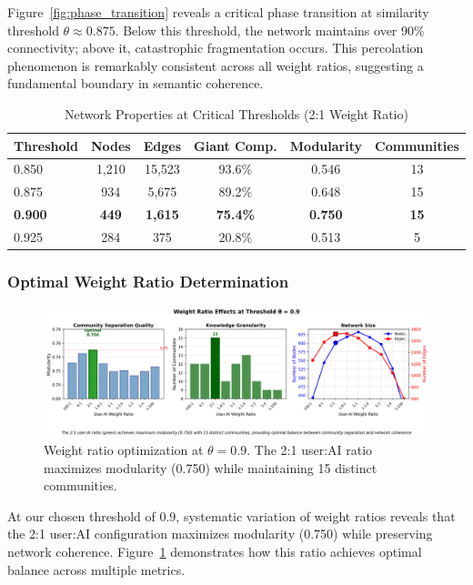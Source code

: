 \documentclass{svproc}
\begin{document}
Figure~\ref{fig:phase_transition} reveals a critical phase transition at similarity threshold $\theta \approx 0.875$. Below this threshold, the network maintains over 90\% connectivity; above it, catastrophic fragmentation occurs. This percolation phenomenon is remarkably consistent across all weight ratios, suggesting a fundamental boundary in semantic coherence.

\begin{table}[h]
\centering
\caption{Network Properties at Critical Thresholds (2:1 Weight Ratio)}
\label{tab:threshold_critical}
\begin{tabular}{lccccc}
\toprule
\textbf{Threshold} & \textbf{Nodes} & \textbf{Edges} & \textbf{Giant Comp.} & \textbf{Modularity} & \textbf{Communities} \\
\midrule
0.850 & 1,210 & 15,523 & 93.6\% & 0.546 & 13 \\
0.875 & 934 & 5,675 & 89.2\% & 0.648 & 15 \\
\textbf{0.900} & \textbf{449} & \textbf{1,615} & \textbf{75.4\%} & \textbf{0.750} & \textbf{15} \\
0.925 & 284 & 375 & 20.8\% & 0.513 & 5 \\
\bottomrule
\end{tabular}
\end{table}


\subsubsection{Optimal Weight Ratio Determination}

\begin{figure}[h]
\centering
\includegraphics[width=\textwidth]{./images/weight_ratio_analysis_clean.png}
\caption{Weight ratio optimization at $\theta = 0.9$. The 2:1 user:AI ratio maximizes modularity (0.750) while maintaining 15 distinct communities.}
\label{fig:weight_ratio_analysis}
\end{figure}

At our chosen threshold of 0.9, systematic variation of weight ratios reveals that the 2:1 user:AI configuration maximizes modularity (0.750) while preserving network coherence. Figure~\ref{fig:weight_ratio_analysis} demonstrates how this ratio achieves optimal balance across multiple metrics.
\end{document}
